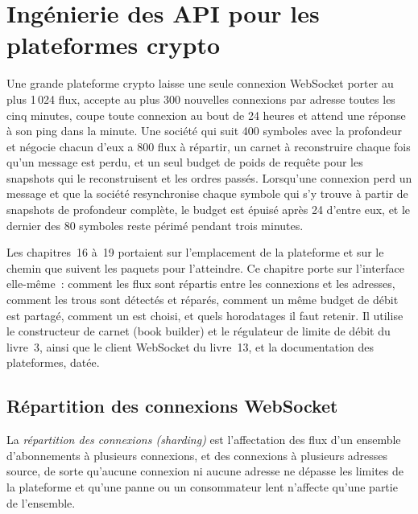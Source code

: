 \chapter{Ingénierie des API pour les plateformes crypto}\label{ch:nw:api-engineering-for-crypto-venues}

Une grande plateforme crypto laisse une seule connexion WebSocket porter au plus 1\,024 flux, accepte au plus 300 nouvelles connexions par adresse toutes les
cinq minutes, coupe toute connexion au bout de 24 heures et attend une réponse à son ping dans la minute. Une société qui suit 400 symboles avec
la profondeur et négocie chacun d'eux a 800 flux à répartir, un carnet à reconstruire chaque fois qu'un message est perdu, et un seul budget de poids de requête pour
les snapshots qui le reconstruisent et les ordres passés. Lorsqu'une connexion perd un message et que la société resynchronise chaque symbole qui s'y trouve
à partir de snapshots de profondeur complète, le budget est épuisé après 24 d'entre eux, et le dernier des 80 symboles reste périmé pendant trois minutes.

Les chapitres~16 à~19 portaient sur l'emplacement de la plateforme et sur le chemin que suivent les paquets pour l'atteindre. Ce chapitre porte sur l'interface elle-même~: comment les flux sont répartis
entre les connexions et les adresses, comment les trous sont détectés et réparés, comment un même budget de débit est partagé, comment un  est choisi, et
quels horodatages il faut retenir. Il utilise le constructeur de carnet (book builder) et le régulateur de limite de débit du livre~3, ainsi que le client WebSocket du livre~13, et la
documentation des plateformes, datée.

\section{Répartition des connexions WebSocket}

\begin{definition}\label{def:nw:api-engineering-for-crypto-venues:shard}
La \emph{répartition des connexions (sharding)} est l'affectation des flux d'un ensemble d'abonnements à plusieurs connexions, et des
connexions à plusieurs adresses source, de sorte qu'aucune connexion ni aucune adresse ne dépasse les limites de la plateforme et qu'une panne ou un consommateur lent
n'affecte qu'une partie de l'ensemble.
\end{definition}


